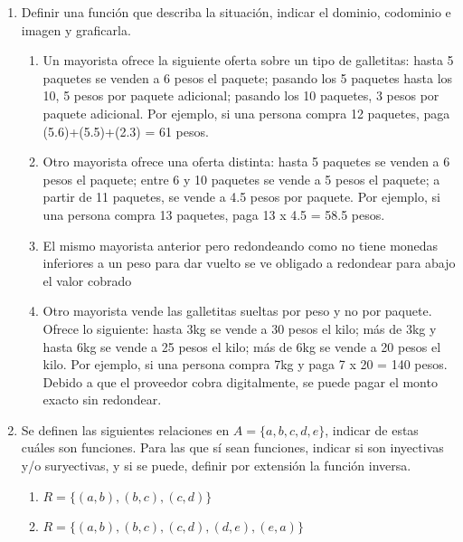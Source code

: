 \documentclass[a4paper]{article}
\newcommand{\exercise}{\item}
\begin{document}
\begin{enumerate}
\begin{enumerate} [label=(\alph*)]
		\item Cada ciudad de la Argentina con la provincia donde está.
		\item Cada ciudad de la Argentina con la provincia de la que es capital.
		\item Cada persona con el club del que es socio/a.
	\end{enumerate}
	\exercise Definir una función que describa la situación, indicar el dominio, codominio e imagen y graficarla.
	\begin{enumerate} [label=(\alph*)]
		\item Un mayorista ofrece la siguiente oferta sobre un tipo de galletitas: hasta 5 paquetes se venden a 6 pesos el paquete; pasando los 5 paquetes hasta los 10, 5 pesos por paquete adicional; pasando los 10 paquetes, 3 pesos por paquete adicional. Por ejemplo, si una persona compra 12 paquetes, paga (5.6)+(5.5)+(2.3) = 61 pesos.
		\item Otro mayorista ofrece una oferta distinta: hasta 5 paquetes se venden a 6 pesos el paquete; entre 6 y 10 paquetes se vende a 5 pesos el paquete; a partir de 11
		paquetes, se vende a 4.5 pesos por paquete. Por ejemplo, si una persona compra 13
		paquetes, paga 13 x 4.5 = 58.5 pesos.
		\item El mismo mayorista anterior pero redondeando como no tiene monedas inferiores a un peso para dar vuelto se ve obligado a redondear para abajo el valor cobrado
		\item Otro mayorista vende las galletitas sueltas por peso y no por paquete. Ofrece lo siguiente: hasta 3kg se vende a 30 pesos el kilo; más de 3kg y hasta 6kg se vende a 25 pesos el kilo; más de 6kg se vende a 20 pesos el kilo. Por ejemplo, si una persona compra 7kg y paga 7 x 20 = 140 pesos. Debido a que el proveedor cobra digitalmente, se puede pagar el monto exacto sin redondear.
	\end{enumerate}
	\exercise Se definen las siguientes relaciones en $A = \{a, b, c, d, e\}$, indicar de estas cuáles son 	funciones. Para las que sí sean funciones, indicar si son inyectivas y/o suryectivas, y si se puede, definir por extensión la función inversa.
	\begin{enumerate} [label=(\alph*)]
		\item $R = \{(a,b), (b,c), (c,d)\}$
		\item $R = \{(a,b), (b,c), (c,d), (d,e), (e,a)\}$

\end{enumerate}
\end{enumerate}
\end{document}
